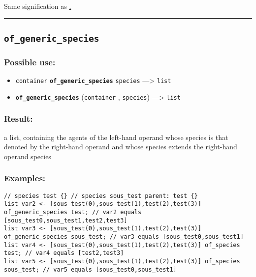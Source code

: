 \documentclass[]{book}
\providecommand{\tightlist}{%
  \setlength{\itemsep}{0pt}\setlength{\parskip}{0pt}}
\theoremstyle{definition}
\theoremstyle{definition}
\theoremstyle{definition}
\theoremstyle{remark}
\begin{document}
Same signification as \href{OperatorsAA\#.}{.}

\begin{center}\rule{0.5\linewidth}{\linethickness}\end{center}

\subsection{\texorpdfstring{\texttt{of\_generic\_species}}{of\_generic\_species}}\label{of_generic_species}

\subsubsection{Possible use:}\label{possible-use-381}

\begin{itemize}
\tightlist
\item
  \texttt{container} \textbf{\texttt{of\_generic\_species}}
  \texttt{species} ---\textgreater{} \texttt{list}
\item
  \textbf{\texttt{of\_generic\_species}} (\texttt{container} ,
  \texttt{species}) ---\textgreater{} \texttt{list}
\end{itemize}

\subsubsection{Result:}\label{result-367}

a list, containing the agents of the left-hand operand whose species is
that denoted by the right-hand operand and whose species extends the
right-hand operand species

\subsubsection{Examples:}\label{examples-261}

\begin{verbatim}
// species test {} // species sous_test parent: test {}  
list var2 <- [sous_test(0),sous_test(1),test(2),test(3)] of_generic_species test; // var2 equals [sous_test0,sous_test1,test2,test3] 
list var3 <- [sous_test(0),sous_test(1),test(2),test(3)] of_generic_species sous_test; // var3 equals [sous_test0,sous_test1] 
list var4 <- [sous_test(0),sous_test(1),test(2),test(3)] of_species test; // var4 equals [test2,test3] 
list var5 <- [sous_test(0),sous_test(1),test(2),test(3)] of_species sous_test; // var5 equals [sous_test0,sous_test1]
\end{verbatim}
\end{document}
